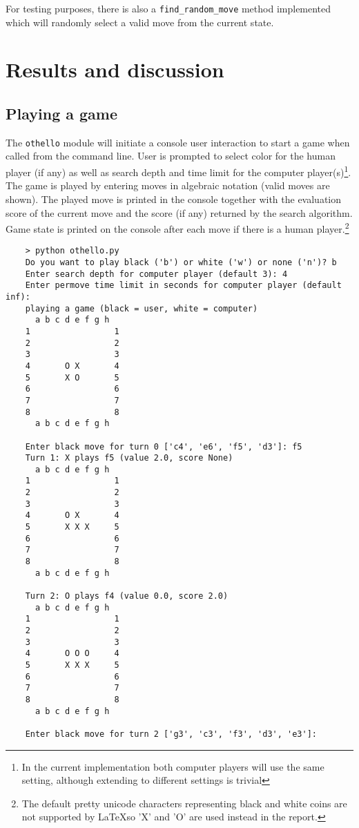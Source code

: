 \documentclass[a4paper]{article}
\begin{document}
 For testing purposes, there is also a \texttt{find\_random\_move} method implemented which will randomly select a valid move from the current state.

 
\section{Results and discussion}

\subsection{Playing a game}
The \texttt{othello} module will initiate a console user interaction to start a game when called from the command line. User is prompted to select color for the human player (if any) as well as search depth and time limit for the computer player(s)\footnote{In the current implementation both computer players will use the same setting, although extending to different settings is trivial}. The game is played by entering moves in algebraic notation (valid moves are shown). The played move is printed in the console together with the evaluation score of the current move and the score (if any) returned by the search algorithm. Game state is printed on the console after each move if there is a human player.\footnote{The default pretty unicode characters representing black and white coins are not supported by \LaTeX so 'X' and 'O' are used instead in the report.}

\begin{verbatim}
    > python othello.py
    Do you want to play black ('b') or white ('w') or none ('n')? b
    Enter search depth for computer player (default 3): 4
    Enter permove time limit in seconds for computer player (default inf): 
    playing a game (black = user, white = computer)
      a b c d e f g h
    1                 1
    2                 2
    3                 3
    4       O X       4
    5       X O       5
    6                 6
    7                 7
    8                 8
      a b c d e f g h
    
    Enter black move for turn 0 ['c4', 'e6', 'f5', 'd3']: f5
    Turn 1: X plays f5 (value 2.0, score None)
      a b c d e f g h
    1                 1
    2                 2
    3                 3
    4       O X       4
    5       X X X     5
    6                 6
    7                 7
    8                 8
      a b c d e f g h
    
    Turn 2: O plays f4 (value 0.0, score 2.0)
      a b c d e f g h
    1                 1
    2                 2
    3                 3
    4       O O O     4
    5       X X X     5
    6                 6
    7                 7
    8                 8
      a b c d e f g h
    
    Enter black move for turn 2 ['g3', 'c3', 'f3', 'd3', 'e3']:
\end{verbatim}
\end{document}
